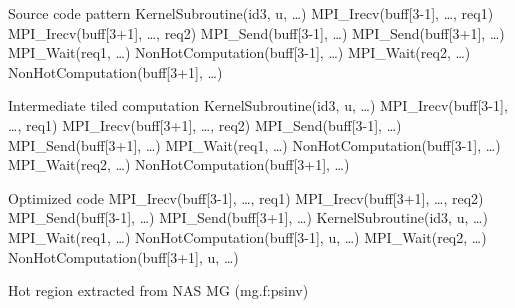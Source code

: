 %
%
%
%

\begin{algorithm}
{\scriptsize
\begin{algorithmic}
\Require Source code pattern
  \State KernelSubroutine(id3, u, \ldots)
\EndFor
  \State MPI\_Irecv(buff[3-1], \ldots, req1)
  \State MPI\_Irecv(buff[3+1], \ldots, req2)
  \State MPI\_Send(buff[3-1], \ldots)
  \State MPI\_Send(buff[3+1], \ldots)
  \State MPI\_Wait(req1, \ldots)
  \State NonHotComputation(buff[3-1], \ldots)
  \State MPI\_Wait(req2, \ldots)
  \State NonHotComputation(buff[3+1], \ldots)
\EndFor

\Ensure Intermediate tiled computation
    \State KernelSubroutine(id3, u, \ldots)
  \EndFor
\EndFor
  \State MPI\_Irecv(buff[3-1], \ldots, req1)
  \State MPI\_Irecv(buff[3+1], \ldots, req2)
  \State MPI\_Send(buff[3-1], \ldots)
  \State MPI\_Send(buff[3+1], \ldots)
  \State MPI\_Wait(req1, \ldots)
  \State NonHotComputation(buff[3-1], \ldots)
  \State MPI\_Wait(req2, \ldots)
  \State NonHotComputation(buff[3+1], \ldots)
\EndFor

\Ensure Optimized code
  \State MPI\_Irecv(buff[3-1], \ldots, req1)
  \State MPI\_Irecv(buff[3+1], \ldots, req2)
  \State MPI\_Send(buff[3-1], \ldots)
  \State MPI\_Send(buff[3+1], \ldots)
    \State KernelSubroutine(id3, u, \ldots)
  \EndFor
  \State MPI\_Wait(req1, \ldots)
  \State NonHotComputation(buff[3-1], u, \ldots)
  \State MPI\_Wait(req2, \ldots)
  \State NonHotComputation(buff[3+1], u, \ldots)
\EndFor
\end{algorithmic}
\caption{Hot region extracted from NAS MG (mg.f:psinv)}
\label{pat:mg}
}%
\end{algorithm}




